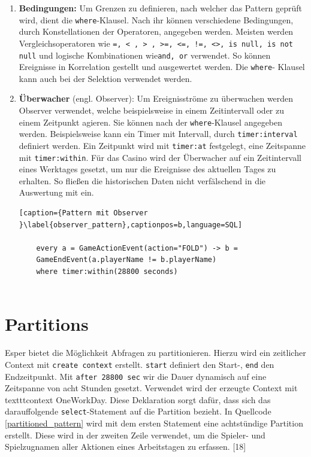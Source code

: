 \begin{enumerate}
	\begin{lstlisting}[caption={Pattern mit Follow-Operator }\label{follow_pattern},captionpos=b,language=SQL]
	
	every a = GameActionEvent(action="FOLD") -> b =
	 GameEndEvent(a.playerName != b.playerName)
	
	\end{lstlisting}
	
	\item \textbf{Bedingungen:}
	Um Grenzen zu definieren, nach welcher das Pattern geprüft wird, dient die \texttt{where}-Klausel. Nach ihr können verschiedene Bedingungen, durch Konstellationen der Operatoren, angegeben werden.
	Meisten werden Vergleichsoperatoren wie \texttt{=, < , > , >=, <=, !=, <>, is null, is not null} und logische Kombinationen wie\texttt{and, or} verwendet. So können Ereignisse in Korrelation gestellt und ausgewertet werden. Die \texttt{where}- Klausel kann auch bei der Selektion verwendet werden.
	
	\item \textbf{Überwacher} (engl. Observer):
	Um Ereignisströme zu überwachen werden Observer verwendet, welche beispielsweise in einem Zeitintervall oder zu einem Zeitpunkt agieren. Sie können nach der \texttt{where}-Klausel angegeben werden. Beispielsweise kann ein Timer mit Intervall, durch \texttt{timer:interval} definiert werden. Ein Zeitpunkt wird
	mit \texttt{timer:at} festgelegt, eine Zeitspanne mit \texttt{timer:within}. Für das Casino wird der Überwacher auf ein Zeitintervall eines Werktages gesetzt, um nur die Ereignisse des aktuellen Tages zu erhalten. So fließen die historischen Daten nicht verfälschend in die Auswertung mit ein.
	
	\begin{lstlisting}[caption={Pattern mit Observer }\label{observer_pattern},captionpos=b,language=SQL]
	
	every a = GameActionEvent(action="FOLD") -> b =
	GameEndEvent(a.playerName != b.playerName)
	where timer:within(28800 seconds)
	
	\end{lstlisting}
	
\end{enumerate}


\section{Partitions}

Esper bietet die Möglichkeit Abfragen zu partitionieren.
Hierzu wird ein zeitlicher Context mit \texttt{create context} erstellt.
\texttt{start} definiert den Start-, \texttt{end} den Endzeitpunkt.
Mit \texttt{after 28800 sec} wir die Dauer dynamisch auf eine Zeitspanne von acht Stunden gesetzt. Verwendet wird der erzeugte Context mit texttt{context OneWorkDay}. Diese Deklaration sorgt dafür, dass sich das darauffolgende \texttt{select}-Statement auf die Partition bezieht.
In Quellcode \ref{partitioned_pattern} wird mit dem ersten Statement eine achtstündige Partition erstellt. Diese wird in der zweiten Zeile verwendet, um die Spieler- und Spielzugnamen aller Aktionen eines Arbeitstagen zu erfassen.
\cite{EsperRef2018}[18]

